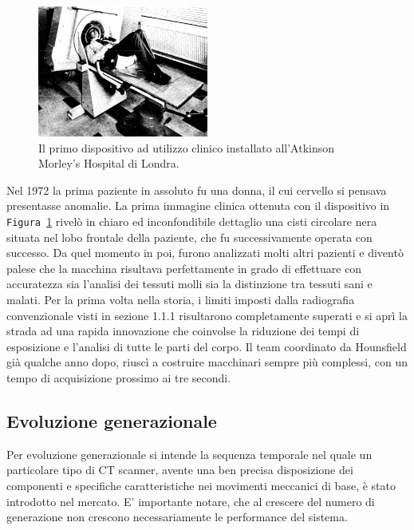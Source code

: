 \documentclass[a4paper,11pt, oneside]{article}
\begin{document}
                    \begin{figure}[h]
                        \centering
                        \includegraphics[width=0.5\textwidth]{clinical}
                        \caption{Il primo dispositivo ad utilizzo clinico installato all'Atkinson Morley’s Hospital di Londra.}
                        \label{fig:clinical}
                    \end{figure}
                            
                    Nel 1972 la prima paziente in assoluto fu una donna, il cui cervello si pensava presentasse anomalie. La prima immagine clinica ottenuta con il dispositivo in \texttt{Figura \ref{fig:clinical}} rivelò in chiaro ed inconfondibile dettaglio una cisti circolare nera situata nel lobo frontale della paziente, che fu successivamente operata con successo. Da quel momento in poi, furono analizzati molti altri pazienti e diventò palese che la macchina risultava perfettamente in grado di effettuare con accuratezza sia l'analisi dei tessuti molli sia la distinzione tra tessuti sani e malati\cite{hounsfield-nobel-lecture}.
                    Per la prima volta nella storia, i limiti imposti dalla radiografia convenzionale visti in sezione 1.1.1 risultarono completamente superati e si aprì la strada ad una rapida innovazione che coinvolse la riduzione dei tempi di esposizione e l'analisi di tutte le parti del corpo. Il team coordinato da Hounsfield già qualche anno dopo, riuscì a costruire macchinari sempre più complessi, con un tempo di acquisizione prossimo ai tre secondi.
                            
            \subsection{Evoluzione generazionale}
                \par
                    Per evoluzione generazionale si intende la sequenza temporale nel quale un particolare tipo di CT scanner, avente una ben precisa disposizione dei componenti e specifiche caratteristiche nei movimenti meccanici di base, è stato introdotto nel mercato. E’ importante notare, che al crescere del numero di generazione non crescono necessariamente le performance del sistema.
                        
\end{document}
